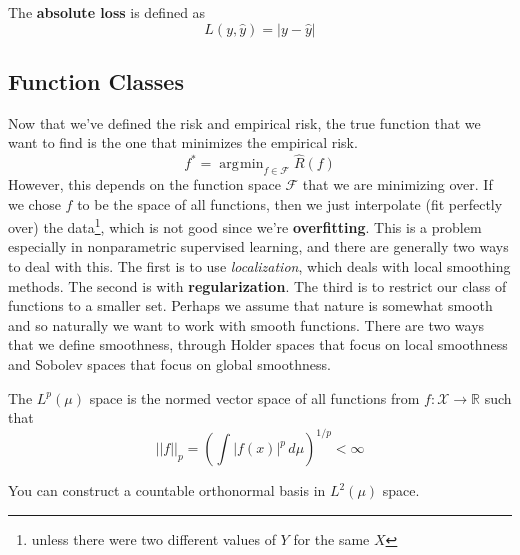 \documentclass{article}
\DeclareMathOperator*{\argmin}{\arg\!\min}
\begin{document}
    \begin{definition}
      The \textbf{absolute loss} is defined as 
      \begin{equation}
        L(y, \hat{y}) = |y - \hat{y}|
      \end{equation}
    \end{definition}

  \subsection{Function Classes}

    Now that we've defined the risk and empirical risk, the true function that we want to find is the one that minimizes the empirical risk. 
    \begin{equation}
      f^\ast = \argmin_{f \in \mathcal{F}} \hat{R} (f)
    \end{equation}
    However, this depends on the function space $\mathcal{F}$ that we are minimizing over. If we chose $f$ to be the space of all functions, then we just interpolate (fit perfectly over) the data\footnote{unless there were two different values of $Y$ for the same $X$}, which is not good since we're \textbf{overfitting}. This is a problem especially in nonparametric supervised learning, and there are generally two ways to deal with this. The first is to use \textit{localization}, which deals with local smoothing methods. The second is with \textbf{regularization}. The third is to restrict our class of functions to a smaller set. Perhaps we assume that nature is somewhat smooth and so naturally we want to work with smooth functions. There are two ways that we define smoothness, through Holder spaces that focus on local smoothness and Sobolev spaces that focus on global smoothness. 

    \begin{definition}[$L^p$ Space]
      The $L^p (\mu)$ space is the normed vector space of all functions from $f: \mathcal{X} \rightarrow \mathbb{R}$ such that 
      \begin{equation}
        ||f||_p = \left( \int |f(x)|^p \,d\mu \right)^{1/p} < \infty
      \end{equation}
    \end{definition}

    \begin{theorem}
      You can construct a countable orthonormal basis in $L^2 (\mu)$ space. 
    \end{theorem}
\end{document}
